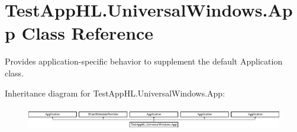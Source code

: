 \hypertarget{class_test_app_h_l_1_1_universal_windows_1_1_app}{}\section{Test\+App\+H\+L.\+Universal\+Windows.\+App Class Reference}
\label{class_test_app_h_l_1_1_universal_windows_1_1_app}


Provides application-\/specific behavior to supplement the default Application class.  


Inheritance diagram for Test\+App\+H\+L.\+Universal\+Windows.\+App\+:\begin{figure}[H]
\begin{center}
\leavevmode
\includegraphics[height=1.037037cm]{class_test_app_h_l_1_1_universal_windows_1_1_app}
\end{center}
\end{figure}
